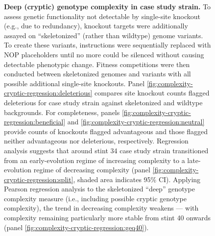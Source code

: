 \begin{figure}
\caption{%
\textbf{Deep (cryptic) genotype complexity in case study strain.}
\footnotesize
To assess genetic functionality not detectable by single-site knockout (e.g., due to redundancy), knockout targets were additionally assayed on ``skeletonized'' (rather than wildtype) genome variants.
To create these variants, instructions were sequentially replaced with NOP placeholders until no more could be silenced without causing detectable phenotypic change.
Fitness competitions were then conducted between skeletonized genomes and variants with all possible additional single-site knockouts.
Panel \ref{fig:complexity-cryptic-regression:deleterious} compares site knockout counts flagged deleterious for case study strain against skeletonized and wildtype backgrounds.
For completeness, panels \ref{fig:complexity-cryptic-regression:beneficial} and \ref{fig:complexity-cryptic-regression:neutral} provide counts of knockouts flagged advantageous and those flagged neither advantageous nor deleterious, respectively.
Regression analysis suggests that around stint 34 case study strain transitioned from an early-evolution regime of increasing complexity to a late-evolution regime of decreasing complexity (panel \ref{fig:complexity-cryptic-regression:split}, shaded area indicates 95\% CI).
Applying Pearson regression analysis to the skeletonized ``deep'' genotype complexity measure (i.e., including possible cryptic genotype complexity), the trend in decreasing complexity weakens --- with complexity remaining particularly more stable from stint 40 onwards (panel \ref{fig:complexity-cryptic-regression:geq40}).
}
\label{fig:complexity-cryptic-regression}

\end{figure}

